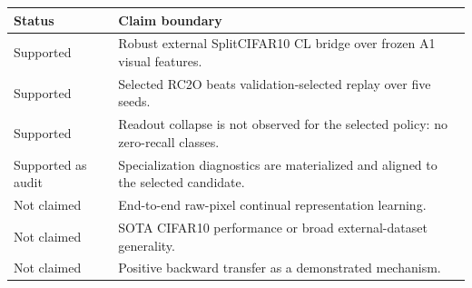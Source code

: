 \begin{tabularx}{\linewidth}{lX}
\toprule
Status & Claim boundary \\
\midrule
Supported & Robust external SplitCIFAR10 CL bridge over frozen A1 visual features. \\
Supported & Selected RC2O beats validation-selected replay over five seeds. \\
Supported & Readout collapse is not observed for the selected policy: no zero-recall classes. \\
Supported as audit & Specialization diagnostics are materialized and aligned to the selected candidate. \\
Not claimed & End-to-end raw-pixel continual representation learning. \\
Not claimed & SOTA CIFAR10 performance or broad external-dataset generality. \\
Not claimed & Positive backward transfer as a demonstrated mechanism. \\
\bottomrule
\end{tabularx}